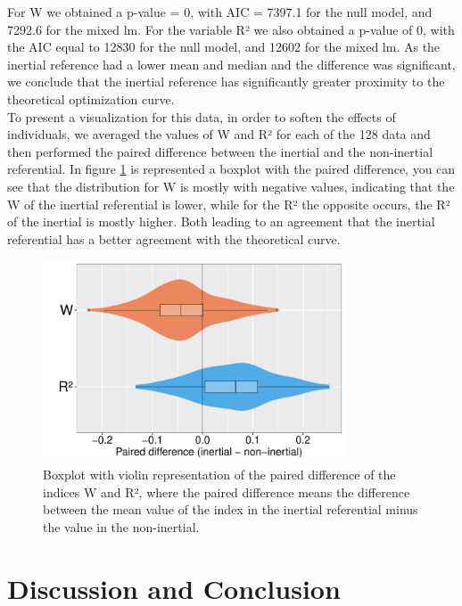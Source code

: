 \documentclass{article}
\begin{document}
For W we obtained a p-value = 0, with AIC = 7397.1 for the null model, and 7292.6 for the mixed lm. For the variable R² we also obtained a p-value of 0, with the AIC equal to 12830 for the null model, and 12602 for the mixed lm. As the inertial reference had a lower mean and median and the difference was significant, we conclude that the inertial reference has significantly greater proximity to the theoretical optimization curve.
\\

To present a visualization for this data, in order to soften the effects of individuals, we averaged the values of W and R² for each of the 128 data and then performed the paired difference between the inertial and the non-inertial referential. In figure \ref{fig:boxplot} is represented a boxplot with the paired difference, you can see that the distribution for W is mostly with negative values, indicating that the W of the inertial referential is lower, while for the R² the opposite occurs, the R² of the inertial is mostly higher. Both leading to an agreement that the inertial referential has a better agreement with the theoretical curve.

\begin{figure}[H]
    \centering
    \includegraphics[width=0.8\textwidth]{paired_difference.pdf}
    \caption{Boxplot with violin representation of the paired difference of the indices W and R², where the paired difference means the difference between the mean value of the index in the inertial referential minus the value in the non-inertial.}
    \label{fig:boxplot}
\end{figure}

\section{Discussion and Conclusion}
\end{document}
